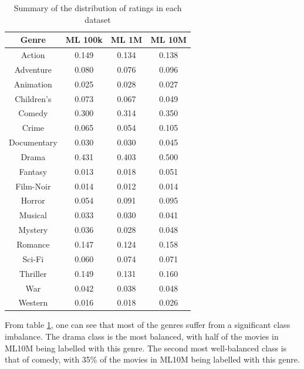 \begin{table}[H]
\centering
\begin{tabular}{c | c | c | c}
\toprule
\textbf{Genre} & \textbf{ML 100k} & \textbf{ML 1M} & \textbf{ML 10M} \\
\midrule
Action & 0.149 & 0.134 & 0.138 \\
Adventure & 0.080 & 0.076 & 0.096 \\
Animation & 0.025 & 0.028 & 0.027 \\
Children's & 0.073 & 0.067 & 0.049 \\
Comedy & 0.300 & 0.314 & 0.350 \\
Crime & 0.065 & 0.054 & 0.105 \\
Documentary & 0.030 & 0.030 & 0.045 \\
Drama & 0.431 & 0.403 & 0.500 \\
Fantasy & 0.013 & 0.018 & 0.051 \\
Film-Noir & 0.014 & 0.012 & 0.014 \\
Horror & 0.054 & 0.091 & 0.095 \\
Musical & 0.033 & 0.030 & 0.041 \\
Mystery & 0.036 & 0.028 & 0.048 \\
Romance & 0.147 & 0.124 & 0.158 \\
Sci-Fi & 0.060 & 0.074 & 0.071 \\
Thriller & 0.149 & 0.131 & 0.160 \\
War & 0.042 & 0.038 & 0.048 \\
Western & 0.016 & 0.018 & 0.026 \\
\bottomrule
\end{tabular}
\caption[Movies per genre as a proportion of the total]{Summary of the distribution of ratings in each dataset}
\label{tab:ML-genres}
\end{table}

From table \ref{tab:ML-genres}, one can see that most of the genres suffer from a significant class imbalance. The drama class is the most balanced, with half of the movies in ML10M being labelled with this genre. The second most well-balanced class is that of comedy, with 35\% of the movies in ML10M being labelled with this genre.